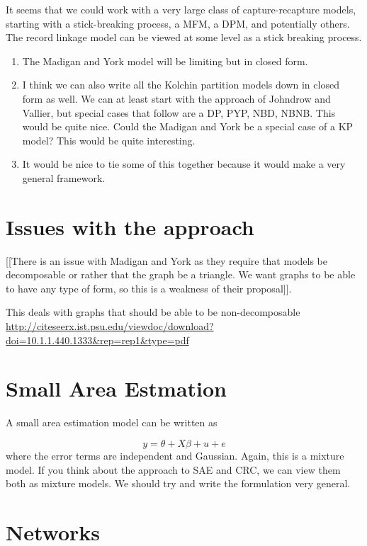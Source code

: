 \documentclass[twoside]{article}
\begin{document}
It seems that we could work with a very large class of capture-recapture models, starting with a stick-breaking process, a MFM, a DPM, and potentially others. The record linkage model can be viewed at some level as a stick breaking process. 

\begin{enumerate}
\item The Madigan and York model will be limiting but in closed form. 
\item I think we can also write all the Kolchin partition models down in closed form as well. We can at least start with the approach of Johndrow and
Vallier, but special cases that follow are a DP, PYP, NBD, NBNB. This would be quite nice. Could the Madigan and York be a special case of a KP model? This would be quite interesting. 
\item It would be nice to tie some of this together because it would make a very general framework.
\end{enumerate}


\section{Issues with the approach}

[[There is an issue with Madigan and York as they require that models be decomposable or rather that the graph be a triangle. We want graphs to be able to have any type of form, so this is a weakness of their proposal]].

This deals with graphs that should be able to be non-decomposable \url{http://citeseerx.ist.psu.edu/viewdoc/download?doi=10.1.1.440.1333&rep=rep1&type=pdf}

\section{Small Area Estmation}

A small area estimation model can be written as

$$y = \theta + X\beta + u + e$$
where the error terms are independent and Gaussian. 
Again, this is a mixture model. If you think about the approach to SAE and CRC, 
we can view them both as mixture models. We should try and write the formulation very general. 

\section{Networks}
\end{document}
